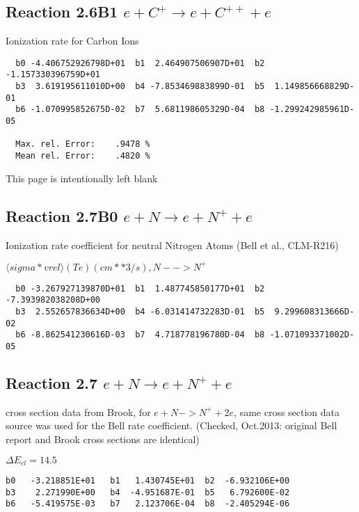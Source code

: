 \documentclass[12pt,dvipdfmx]{article}
\begin{document}
\subsection{
Reaction 2.6B1   $e + C^+ \rightarrow e + C^{++} + e  $
}

  Ionization rate for Carbon Ions


\begin{small}\begin{verbatim}
  b0 -4.406752926798D+01  b1  2.464907506907D+01  b2 -1.157330396759D+01
  b3  3.619195611010D+00  b4 -7.853469883899D-01  b5  1.149856668829D-01
  b6 -1.070995852675D-02  b7  5.681198605329D-04  b8 -1.299242985961D-05

  Max. rel. Error:    .9478 %
  Mean rel. Error:    .4820 %

\end{verbatim}\end{small}
\newpage
This page is intentionally left blank
\newpage



\subsection{
Reaction 2.7B0   $e + N \rightarrow e + N^+ + e  $
}

  Ionization rate coefficient for neutral Nitrogen Atoms
  (Bell et al., CLM-R216) \cite{kn:Bell}

  $ \langle sigma*vrel \rangle(Te)  (cm**3/s), N --> N^+$

\begin{small}\begin{verbatim}
  b0 -3.267927139870D+01  b1  1.487745850177D+01  b2 -7.393982038208D+00
  b3  2.552657836634D+00  b4 -6.031414732283D-01  b5  9.299608313666D-02
  b6 -8.862541230616D-03  b7  4.718778196780D-04  b8 -1.071093371002D-05

\end{verbatim}\end{small}

\subsection{
Reaction 2.7    $e + N \rightarrow e + N^+ + e  $
}
cross section data from Brook, \cite{kn:Brook}   for $ e + N -> N^+ + 2e $,
same cross section data source was used for the Bell rate coefficient.
(Checked, Oct.2013: original Bell report and Brook cross sections
are identical)

$\Delta E_{el} = 14.5$
\begin{small}\begin{verbatim}
b0   -3.218851E+01   b1   1.430745E+01  b2  -6.932106E+00
b3    2.271990E+00   b4  -4.951687E-01  b5   6.792600E-02
b6   -5.419575E-03   b7   2.123706E-04  b8  -2.405294E-06
\end{verbatim}\end{small}
\end{document}
